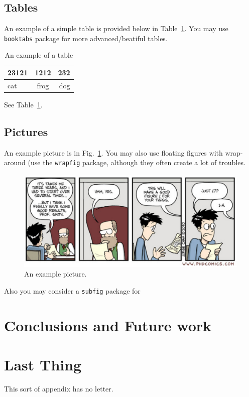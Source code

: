 \documentclass[a4paper,11pt,phdthesis,twoside,oneandhalfspace,pdflatex]{cssethesis} %
\begin{document}
\section{Tables}
An example of a simple table is provided below in Table~\ref{tab:example}. You may use \verb+booktabs+ package for more advanced/beatiful tables.

\begin{table}[ht]
	\begin{center}
	\begin{tabular}{lcr}
	23121 & 1212 & 232 \\ \hline  
	cat & frog & dog
	\end{tabular}
	\end{center}
\caption{An example of a table}
\label{tab:example}
\end{table}

See Table~\ref{tab:example}.


\section{Pictures}
An example picture is in Fig.~\ref{fig:examplepic}. You may also use floating figures with wrap-around (use the \verb|wrapfig| package, although they often create a lot of troubles.

\begin{figure}[ht!]
\centering\includegraphics[width=0.9\linewidth]{phd101310s}
\caption{An example picture.}
\label{fig:examplepic}
\end{figure}

Also you may consider a \verb|subfig| package for 





\chapter{Conclusions and Future work}\label{chap:summary}



\backmatter %



\chapter{Last Thing} %
This sort of appendix has no letter. 



\pagestyle{plain}

 
\end{document}
